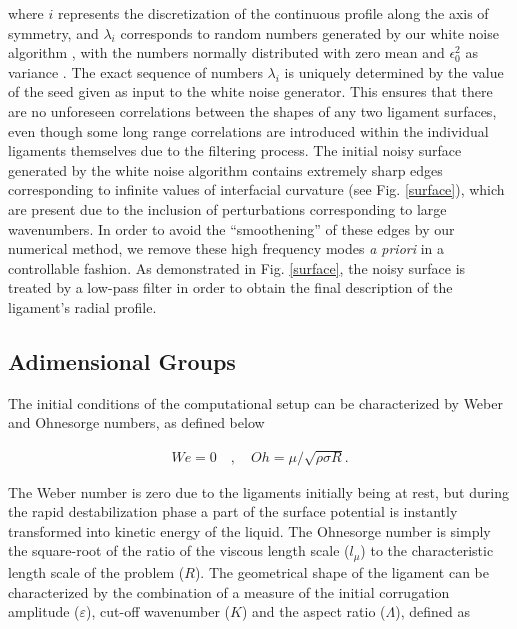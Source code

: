 where $i$ represents the discretization of the continuous profile 
along the axis of symmetry, and $\lambda_i$ corresponds to random numbers
generated by our white noise algorithm  
, with the numbers normally 
distributed with zero mean and $\epsilon_{0}^{2}$ as variance .
The exact sequence of numbers $\lambda_i$ is uniquely determined 
by the value of the seed given as input to the white noise generator.
This ensures that there are no unforeseen correlations between the shapes of any two
ligament surfaces, even though some long range correlations are introduced
within the individual ligaments themselves due to the filtering process. 
The initial noisy surface generated by the white noise algorithm
contains extremely sharp edges corresponding to infinite values of 
interfacial curvature (see Fig. \ref{surface}), which are present due
to the inclusion of perturbations corresponding to large wavenumbers. 
In order to avoid the ``smoothening'' of these edges by our numerical method,   
we remove these high frequency modes \textit{a priori} in a controllable fashion. 
As demonstrated in Fig. \ref{surface}, the noisy surface is treated by a low-pass filter 
in order to obtain the final description of the ligament's radial profile. 


\subsection*{Adimensional Groups}

The initial conditions of the computational setup can be 
characterized by Weber and Ohnesorge numbers, as defined below   

\begin{align}
	We = 0 \quad , \quad Oh = \mu / \sqrt{\rho \sigma R} . 
\end{align}

The Weber number is zero due to the ligaments initially being at rest, 
but during the rapid destabilization phase a part of the surface 
potential is instantly transformed into kinetic energy of the liquid.  
The Ohnesorge number is simply the square-root of the ratio  
of the viscous length scale ($l_\mu$)  
to the characteristic length scale of the problem ($R$).
The geometrical shape of the ligament can 
be characterized by the combination of a measure of the initial
corrugation amplitude ($\varepsilon$),
cut-off wavenumber ($K$) and the aspect ratio ($\Lambda$), defined as   

